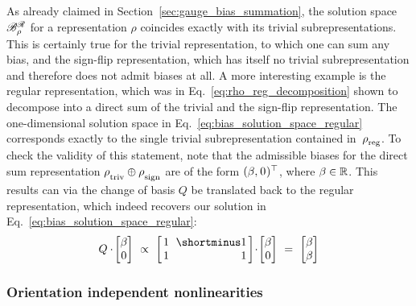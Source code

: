 As already claimed in Section~\ref{sec:gauge_bias_summation}, the solution space $\mathscr{B}^{\mathscr{R}}_\rho$ for a representation $\rho$ coincides exactly with its trivial subrepresentations.
This is certainly true for the trivial representation, to which one can sum any bias, and the sign-flip representation, which has itself no trivial subrepresentation and therefore does not admit biases at all.
A more interesting example is the regular representation, which was in Eq.~\ref{eq:rho_reg_decomposition} shown to decompose into a direct sum of the trivial and the sign-flip representation.
The one-dimensional solution space in Eq.~\ref{eq:bias_solution_space_regular} corresponds exactly to the single trivial subrepresentation contained in~$\rho_{\overset{}{\textup{reg}}}$.
To check the validity of this statement, note that the admissible biases for the direct sum representation $\rho_{\overset{}{\textup{triv}}} \oplus \rho_{\overset{}{\textup{sign}}}$ are of the form $(\beta,\mkern1mu 0\mkern1mu)^\top$, where $\beta\in\mathbb{R}$.
This results can via the change of basis $Q$ be translated back to the regular representation, which indeed recovers our solution in Eq.~\eqref{eq:bias_solution_space_regular}:
\begin{align}
    Q \cdot\mkern-2mu \begin{bmatrix} \beta \\ 0 \end{bmatrix}
    \ \propto\ 
    \begin{bmatrix} \hspace{1.5pt}
        1 &\mkern-7mu \shortminus1 \hspace*{1.5pt} \\ \hspace{1.5pt} 1 &\mkern-7mu \phantom{\shortminus}1 \hspace*{1.5pt}
    \end{bmatrix}
    \!\cdot\! \begin{bmatrix} \beta \\ 0 \end{bmatrix}
    \ =\ 
    \begin{bmatrix} \beta \\ \beta \end{bmatrix}
\end{align}





\subsubsection{Orientation independent nonlinearities}
\label{sec:mobius_nonlin}

